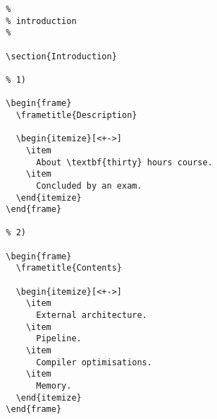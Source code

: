 \begin{verbatim}
  %
  % introduction
  %

  \section{Introduction}

  % 1)

  \begin{frame}
    \frametitle{Description}

    \begin{itemize}[<+->]
      \item
        About \textbf{thirty} hours course.
      \item
        Concluded by an exam.
    \end{itemize}
  \end{frame}

  % 2)

  \begin{frame}
    \frametitle{Contents}

    \begin{itemize}[<+->]
      \item
        External architecture.
      \item
        Pipeline.
      \item
        Compiler optimisations.
      \item
        Memory.
    \end{itemize}
  \end{frame}
\end{verbatim}

